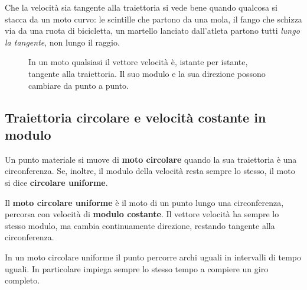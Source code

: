 Che la velocità sia tangente alla traiettoria si vede bene quando qualcosa si stacca da un moto curvo: le scintille che partono da una mola, il fango che schizza via da una ruota di bicicletta, un martello lanciato dall'atleta partono tutti \emph{lungo la tangente}, non lungo il raggio.

\begin{figure}[!htbp]
    \centering
    \caption{In un moto qualsiasi il vettore velocità è, istante per istante, tangente alla traiettoria. Il suo modulo e la sua direzione possono cambiare da punto a punto.}
    \label{fig:v-tangente}
\end{figure}

\subsection{Traiettoria circolare e velocità costante in modulo}
Un punto materiale si muove di \textbf{moto circolare} quando la sua traiettoria è una circonferenza. Se, inoltre, il modulo della velocità resta sempre lo stesso, il moto si dice \textbf{circolare uniforme}.

\begin{definizione}
Il \textbf{moto circolare uniforme} è il moto di un punto lungo una circonferenza, percorsa con velocità di \textbf{modulo costante}. Il vettore velocità ha sempre lo stesso modulo, ma cambia continuamente direzione, restando tangente alla circonferenza.
\end{definizione}

In un moto circolare uniforme il punto percorre archi uguali in intervalli di tempo uguali. In particolare impiega sempre lo stesso tempo a compiere un giro completo.

